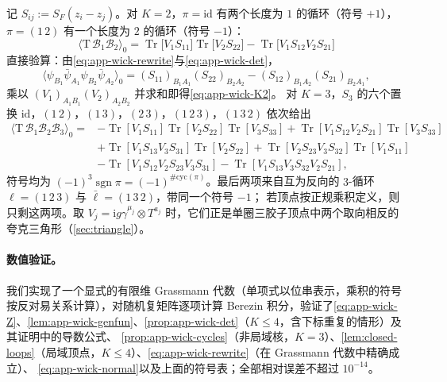 \documentclass[UTF8,a4paper,11pt,fontset=fandol]{ctexart}
\theoremstyle{cplain}
\theoremstyle{cdefinition}
\theoremstyle{cremark}
\numberwithin{equation}{section}
\DeclareMathOperator{\Tr}{Tr}
\newcommand{\SF}{S_{F}}                              %
\newcommand{\ii}{\mathrm{i}}                        %
\begin{document}
记 $S_{ij}:=\SF(z_i-z_j)$。对 $K=2$，$\pi=\mathrm{id}$ 有两个长度为 $1$ 的循环（符号 $+1$），$\pi=(1\,2)$ 有一个长度为 $2$ 的循环（符号 $-1$）：
\begin{equation}\label{eq:app-wick-K2}
\bigl\langle\mathrm T\,\mathcal B_1\mathcal B_2\bigr\rangle_0=\Tr\bigl[V_1S_{11}\bigr]\Tr\bigl[V_2S_{22}\bigr]-\Tr\bigl[V_1S_{12}V_2S_{21}\bigr]
\end{equation}
直接验算：由\cref{eq:app-wick-rewrite}与\cref{eq:app-wick-det}，
\begin{equation*}
\bigl\langle\psi_{B_1}\bar\psi_{A_1}\psi_{B_2}\bar\psi_{A_2}\bigr\rangle_0=(S_{11})_{B_1A_1}(S_{22})_{B_2A_2}-(S_{12})_{B_1A_2}(S_{21})_{B_2A_1},
\end{equation*}
乘以 $(V_1)_{A_1B_1}(V_2)_{A_2B_2}$ 并求和即得\cref{eq:app-wick-K2}。
对 $K=3$，$S_3$ 的六个置换 $\mathrm{id}$，$(1\,2)$，$(1\,3)$，$(2\,3)$，$(1\,2\,3)$，$(1\,3\,2)$ 依次给出
\begin{equation}\label{eq:app-wick-K3}
\begin{aligned}
\bigl\langle\mathrm T\,\mathcal B_1\mathcal B_2\mathcal B_3\bigr\rangle_0={}&-\Tr[V_1S_{11}]\Tr[V_2S_{22}]\Tr[V_3S_{33}]
+\Tr[V_1S_{12}V_2S_{21}]\Tr[V_3S_{33}]\\
&+\Tr[V_1S_{13}V_3S_{31}]\Tr[V_2S_{22}]+\Tr[V_2S_{23}V_3S_{32}]\Tr[V_1S_{11}]\\
&-\Tr[V_1S_{12}V_2S_{23}V_3S_{31}]-\Tr[V_1S_{13}V_3S_{32}V_2S_{21}] ,
\end{aligned}
\end{equation}
符号均为 $(-1)^3\operatorname{sgn}\pi=(-1)^{\#\mathrm{cyc}(\pi)}$。最后两项来自互为反向的 $3$-循环 $\ell=(1\,2\,3)$ 与 $\bar\ell=(1\,3\,2)$，带同一个符号 $-1$；
若顶点按正规乘积定义，则只剩这两项。取 $V_j=\ii g\gamma^{\mu_j}\otimes T^{a_j}$ 时，它们正是单圈三胶子顶点中两个取向相反的夸克三角形（\cref{sec:triangle}）。

\paragraph{数值验证。}
我们实现了一个显式的有限维 Grassmann 代数（单项式以位串表示，乘积的符号按反对易关系计算），对随机复矩阵逐项计算 Berezin 积分，验证了\cref{eq:app-wick-Z}、\cref{lem:app-wick-genfun}、\cref{prop:app-wick-det}（$K\le4$，含下标重复的情形）及其证明中的导数公式、
\cref{prop:app-wick-cycles}（非局域核，$K=3$）、\cref{lem:closed-loops}（局域顶点，$K\le4$）、\cref{eq:app-wick-rewrite}（在 Grassmann 代数中精确成立）、
\cref{eq:app-wick-normal}以及上面的符号表；全部相对误差不超过 $10^{-14}$。
\end{document}
